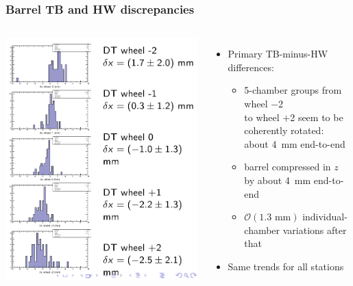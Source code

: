 \documentclass[compress]{beamer}
\begin{document}
\begin{frame}
\frametitle{Barrel TB and HW discrepancies}
\begin{columns}
\includegraphics[width=\linewidth]{twist1.png}

\begin{itemize}
\item Primary TB-minus-HW differences:
\begin{itemize}\setlength{\itemsep}{0.1 cm}
\item 5-chamber groups from wheel $-$2 \\ to wheel $+$2 seem to be coherently rotated: about 4~mm end-to-end
\item barrel compressed in $z$ by about 4~mm end-to-end
\item $\mathcal{O}(1.3\mbox{ mm})$ individual-chamber variations after that
\end{itemize}
\item<2> Same trends for all stations
\end{itemize}


\end{columns}
\end{frame}
\end{document}
